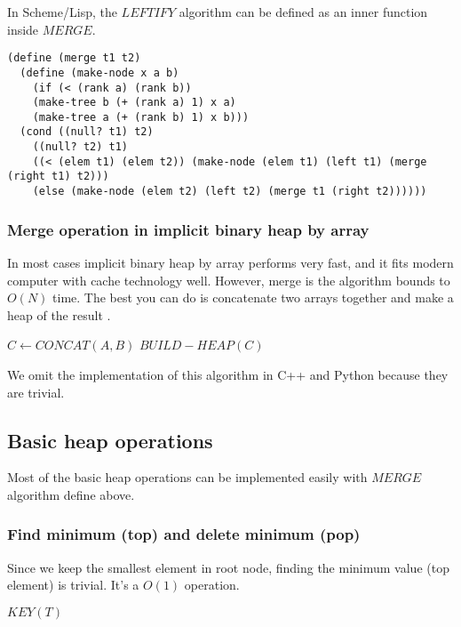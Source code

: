 \documentclass{article}
\begin{document}
In Scheme/Lisp, the $LEFTIFY$ algorithm can be defined as an
inner function inside $MERGE$.

\lstset{language=lisp}
\begin{lstlisting}
(define (merge t1 t2)
  (define (make-node x a b)
    (if (< (rank a) (rank b))
	(make-tree b (+ (rank a) 1) x a)
	(make-tree a (+ (rank b) 1) x b)))
  (cond ((null? t1) t2)
	((null? t2) t1)
	((< (elem t1) (elem t2)) (make-node (elem t1) (left t1) (merge (right t1) t2)))
	(else (make-node (elem t2) (left t2) (merge t1 (right t2))))))
\end{lstlisting}

\subsubsection{Merge operation in implicit binary heap by array}

In most cases implicit binary heap by array performs very fast, and
it fits modern computer with cache technology well. However, merge
is the algorithm bounds to $O(N)$ time. The best you can do is
concatenate two arrays together and make a heap of the result \cite{NIST}.

\begin{algorithmic}[1]
  $C \gets CONCAT(A, B)$
  $BUILD-HEAP(C)$
\EndFunction
\end{algorithmic}

We omit the implementation of this algorithm in C++ and Python because
they are trivial.

\subsection{Basic heap operations}

Most of the basic heap operations can be implemented easily with $MERGE$
algorithm define above.

\subsubsection{Find minimum (top) and delete minimum (pop)}
Since we keep the smallest element in root node, finding the minimum
value (top element) is trivial. It's a $O(1)$ operation.

\begin{algorithmic}[1]
  \State \Return $KEY(T)$
\EndFunction
\end{algorithmic}
\end{document}
